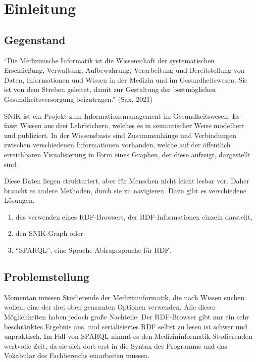 \chapter{Einleitung}\label{ch:introduction}

\section{Gegenstand}
\enquote{Die Medizinische Informatik ist die Wissenschaft der systematischen Erschließung, Verwaltung, Aufbewahrung, Verarbeitung und Bereitstellung von Daten, Informationen und Wissen in der Medizin und im Gesundheitswesen. Sie ist von dem Streben geleitet, damit zur Gestaltung der bestmöglichen Gesundheitsversorgung beizutragen.} (Sax, 2021)

SNIK ist ein Projekt zum Informationsmanagement im Gesundheitswesen.
Es fasst Wissen aus drei Lehrbüchern, welches es in semantischer Weise modelliert und publiziert.
In der Wissensbasis sind Zusammenhänge und Verbindungen zwischen verschiedenen Informationen vorhanden, welche auf der öffentlich erreichbaren Visualisierung in Form eines Graphen, der diese aufzeigt, dargestellt sind.

Diese Daten liegen strukturiert, aber für Menschen nicht leicht lesbar vor. Daher braucht es andere Methoden, durch sie zu navigieren.
Dazu gibt es verschiedene Lösungen,
\begin{enumerate}
\item das verwenden eines RDF-Browsers, der RDF-Informationen einzeln darstellt,
\item den SNIK-Graph oder
\item \enquote{SPARQL}, eine Sprache Abfragesprache für RDF.
\end{enumerate}

\section{Problemstellung}

Momentan müssen Studierende der Medizininformatik, die nach Wissen suchen wollen, eine der drei oben genannten Optionen verwenden.
Alle dieser Möglichkeiten haben jedoch große Nachteile.
Der RDF-Browser gibt nur ein sehr beschränktes Ergebnis aus, und serialisiertes RDF selbst zu lesen ist schwer und unpraktisch.
Im Fall von SPARQL nimmt es den Medizininformatik-Studierenden wertvolle Zeit, da sie sich dort erst in die Syntax des Programms und das Vokabular des Fachbereichs einarbeiten müssen.

